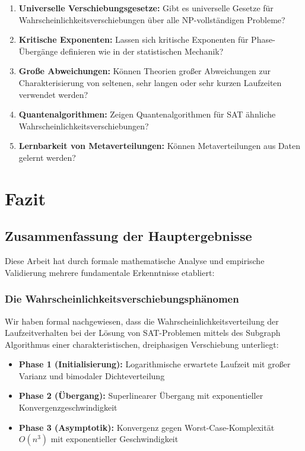 ﻿\documentclass[a4paper,12pt]{article}
\theoremstyle{definition}
\begin{document}
\begin{enumerate}
	\item \textbf{Universelle Verschiebungsgesetze:} Gibt es universelle Gesetze für Wahrscheinlichkeitsverschiebungen über alle NP-vollständigen Probleme?
	
	\item \textbf{Kritische Exponenten:} Lassen sich kritische Exponenten für Phase-Übergänge definieren wie in der statistischen Mechanik?
	
	\item \textbf{Große Abweichungen:} Können Theorien großer Abweichungen zur Charakterisierung von seltenen, sehr langen oder sehr kurzen Laufzeiten verwendet werden?
	
	\item \textbf{Quantenalgorithmen:} Zeigen Quantenalgorithmen für SAT ähnliche Wahrscheinlichkeitsverschiebungen?
	
	\item \textbf{Lernbarkeit von Metaverteilungen:} Können Metaverteilungen aus Daten gelernt werden?
\end{enumerate}

\section{Fazit}

\subsection{Zusammenfassung der Hauptergebnisse}

Diese Arbeit hat durch formale mathematische Analyse und empirische Validierung mehrere fundamentale Erkenntnisse etabliert:

\subsubsection{Die Wahrscheinlichkeitsverschiebungsphänomen}

Wir haben formal nachgewiesen, dass die Wahrscheinlichkeitsverteilung der Laufzeitverhalten bei der Lösung von SAT-Problemen mittels des Subgraph Algorithmus einer charakteristischen, dreiphasigen Verschiebung unterliegt:

\begin{itemize}
	\item \textbf{Phase 1 (Initialisierung):} Logarithmische erwartete Laufzeit mit großer Varianz und bimodaler Dichteverteilung
	\item \textbf{Phase 2 (Übergang):} Superlinearer Übergang mit exponentieller Konvergenzgeschwindigkeit
	\item \textbf{Phase 3 (Asymptotik):} Konvergenz gegen Worst-Case-Komplexität $O(n^3)$ mit exponentieller Geschwindigkeit
\end{itemize}
\end{document}
